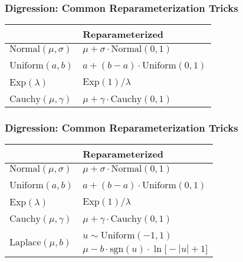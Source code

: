 \documentclass{beamer}
\begin{document}
\begin{frame}
  \frametitle{Digression: Common Reparameterization Tricks}
  \begin{center}
  \begin{tabular}{C{4cm}C{4cm}}
  \toprule
  {} & Reparameterized \\
  \midrule
  $\text{Normal}(\mu, \sigma)$   &  $\mu + \sigma \cdot \text{Normal}(0, 1)$ \\
  \\
  $\text{Uniform}(a, b)$   &  $a + (b - a) \cdot \text{Uniform}(0, 1)$ \\
  \\
  $\text{Exp}(\lambda)$   &  $\text{Exp}(1) / \lambda$ \\
  \\
  $\text{Cauchy}(\mu, \gamma)$   &  $\mu + \gamma \cdot \text{Cauchy}(0, 1)$ \\
  \bottomrule
  \end{tabular}
  \end{center}
\end{frame}

\begin{frame}
  \frametitle{Digression: Common Reparameterization Tricks}
  \begin{center}
  \begin{tabular}{C{4cm}C{4cm}}
  \toprule
  {} & Reparameterized \\
  \midrule
  $\text{Normal}(\mu, \sigma)$   &  $\mu + \sigma \cdot \text{Normal}(0, 1)$ \\
  \\
  $\text{Uniform}(a, b)$   &  $a + (b - a) \cdot \text{Uniform}(0, 1)$ \\
  \\
  $\text{Exp}(\lambda)$   &  $\text{Exp}(1) / \lambda$ \\
  \\
  $\text{Cauchy}(\mu, \gamma)$   &  $\mu + \gamma \cdot \text{Cauchy}(0, 1)$ \\
  \\
    &  $u \sim \text{Uniform}(-1, 1)$ \\
                                          & $\mu - b \cdot \text{sgn}(u) \cdot \ln \big[-|u|+1 \big]$ \\
  \bottomrule
  \end{tabular}
  \end{center}
\end{frame}
\end{document}
